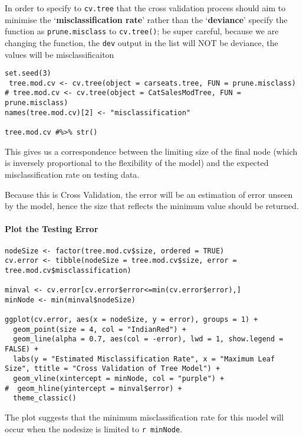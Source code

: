 \documentclass[
]{article}
\newcommand{\passthrough}[1]{#1}
\begin{document}
In order to specify to \passthrough{\lstinline!cv.tree!} that the cross
validation process should aim to minimise the `\textbf{misclassification
rate}' rather than the `\textbf{deviance}' specify the function as
\passthrough{\lstinline!prune.misclass!} to
\passthrough{\lstinline!cv.tree()!}; be super careful, because we are
changing the function, the \passthrough{\lstinline!dev!} output in the
list will NOT be deviance, the values will be misclassificaiton

\begin{lstlisting}
set.seed(3)
 tree.mod.cv <- cv.tree(object = carseats.tree, FUN = prune.misclass)
# tree.mod.cv <- cv.tree(object = CatSalesModTree, FUN = prune.misclass)
names(tree.mod.cv)[2] <- "misclassification"

tree.mod.cv #%>% str()

\end{lstlisting}

This gives us a correspondence between the limiting size of the final
node (which is inversely proportional to the flexibility of the model)
and the expected misclassification rate on testing data.

Because this is Cross Validation, the error will be an estimation of
error unseen by the model, hence the size that reflects the minimum
value should be returned.

\hypertarget{plot-the-testing-error}{%
\paragraph{Plot the Testing Error}\label{plot-the-testing-error}}

\begin{lstlisting}
nodeSize <- factor(tree.mod.cv$size, ordered = TRUE)
cv.error <- tibble(nodeSize = tree.mod.cv$size, error = tree.mod.cv$misclassification)

minval <- cv.error[cv.error$error<=min(cv.error$error),]
minNode <- min(minval$nodeSize)

ggplot(cv.error, aes(x = nodeSize, y = error), groups = 1) +
  geom_point(size = 4, col = "IndianRed") +
  geom_line(alpha = 0.7, aes(col = -error), lwd = 1, show.legend = FALSE) + 
  labs(y = "Estimated Misclassification Rate", x = "Maximum Leaf Size", ttitle = "Cross Validation of Tree Model") +
  geom_vline(xintercept = minNode, col = "purple") +
#  geom_hline(yintercept = minval$error) +
  theme_classic()
\end{lstlisting}

The plot suggests that the minimum misclassification rate for this model
will occur when the nodesize is limited to
\passthrough{\lstinline!r minNode!}.
\end{document}

